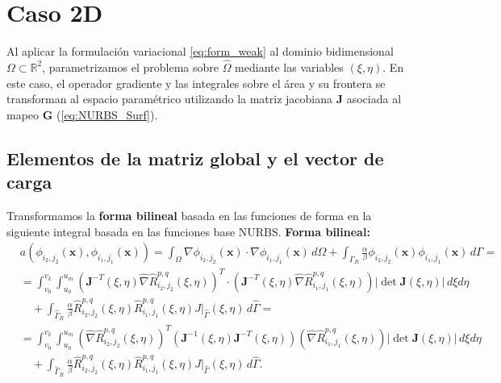 \documentclass[11pt]{book}
\theoremstyle{plain} %
\theoremstyle{definition} %
\theoremstyle{definition} %
\begin{document}
\section{Caso 2D}

Al aplicar la formulación variacional \eqref{eq:form_weak} al dominio bidimensional $\Omega \subset \mathbb{R}^2$, parametrizamos el problema sobre $\hat{\Omega}$ mediante las variables $(\xi, \eta)$. En este caso, el operador gradiente y las integrales sobre el área y su frontera se transforman al espacio paramétrico utilizando la matriz jacobiana $\mathbf{J}$ asociada al mapeo $\mathbf{G}$ (\ref{eq:NURBS_Surf}).

\subsection{Elementos de la matriz global y el vector de carga}
Transformamos la \textbf{forma bilineal} basada en las funciones de forma en la siguiente integral basada en las funciones base NURBS.
\textbf{Forma bilineal:}
{\setlength{\abovedisplayskip}{1pt}
\setlength{\belowdisplayskip}{3pt}
\begin{align*}
    &a(\phi_{i_2,j_2}(\mathbf{x}),\phi_{i_1,j_1}(\mathbf{x})) = \int_{\Omega}\nabla \phi_{i_2,j_2}(\mathbf{x}) \cdot \nabla \phi_{i_1,j_1}(\mathbf{x}) \, d\Omega \nonumber + \int_{\Gamma_R}\frac{\alpha}{\beta}\phi_{i_2,j_2}(\mathbf{x})\phi_{i_1,j_1}(\mathbf{x}) \, d\Gamma =\\[10pt]
    &= \int_{v_0}^{v_{k}}\int_{u_0}^{u_{m}} \left( \mathbf{J}^{-T}(\xi,\eta) \hat{\nabla} \hat{R}_{i_2,j_2}^{p,q}(\xi,\eta) \right)^T \cdot \left( \mathbf{J}^{-T}(\xi,\eta) \hat{\nabla} \hat{R}_{i_1,j_1}^{p,q}(\xi,\eta) \right) |\det \mathbf{J}(\xi,\eta)| \, d\xi d\eta \nonumber \\
    &\quad + \int_{\hat{\Gamma}_R}\frac{\alpha}{\beta}\hat{R}_{i_2,j_2}^{p,q}(\xi,\eta)\hat{R}_{i_1,j_1}^{p,q}(\xi,\eta) J|_{\hat{\Gamma}}(\xi,\eta) \, d\hat{\Gamma} =\\[10pt]
    &= \int_{v_0}^{v_{k}}\int_{u_0}^{u_{m}} \left(\hat{\nabla}\hat{R}_{i_2,j_2}^{p,q}(\xi,\eta)\right)^T \left( \mathbf{J}^{-1}(\xi,\eta) \mathbf{J}^{-T}(\xi,\eta) \right) \left(\hat{\nabla}\hat{R}_{i_1,j_1}^{p,q}(\xi,\eta)\right) |\det \mathbf{J}(\xi,\eta)| \, d\xi d\eta \nonumber \\
    &\quad + \int_{\hat{\Gamma}_R}\frac{\alpha}{\beta}\hat{R}_{i_2,j_2}^{p,q}(\xi,\eta)\hat{R}_{i_1,j_1}^{p,q}(\xi,\eta) J|_{\hat{\Gamma}}(\xi,\eta) \, d\hat{\Gamma}.
\end{align*}
}
\vspace{0.2cm}
\end{document}
